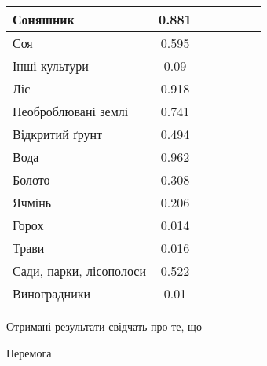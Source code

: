 \begin{table}[!ht]
\begin{tabular}{|K|S|C|C|S|C|C|}
        \hline Соняшник                      & 0.881                                     &                                           &              &  &         &              \\
        \hline Соя                           & 0.595                                     &                                           &              &  &         &              \\
        \hline Інші культури                 & 0.09                                      &                                           &              &  &         &              \\
        \hline Ліс                           & 0.918                                     &                                           &              &  &         &              \\
        \hline Необроблювані землі           & 0.741                                     &                                           &              &  &         &              \\
        \hline Відкритий ґрунт               & 0.494                                     &                                           &              &  &         &              \\
        \hline Вода                          & 0.962                                     &                                           &              &  &         &              \\
        \hline Болото                        & 0.308                                     &                                           &              &  &         &              \\
        \hline Ячмінь                        & 0.206                                     &                                           &              &  &         &              \\
        \hline Горох                         & 0.014                                     &                                           &              &  &         &              \\
        \hline Трави                         & 0.016                                     &                                           &              &  &         &              \\
        \hline Сади, парки, лісополоси       & 0.522                                     &                                           &              &  &         &              \\
        \hline Виноградники                  & 0.01                                      &                                           &              &  &         &              \\
        \hline
    \end{tabular}
    \label{tab:segm_result_augm_per_classes}
\end{table}

Отримані результати свідчать про те, що

\chapconclude{\ref{chap:practice}}
Перемога
